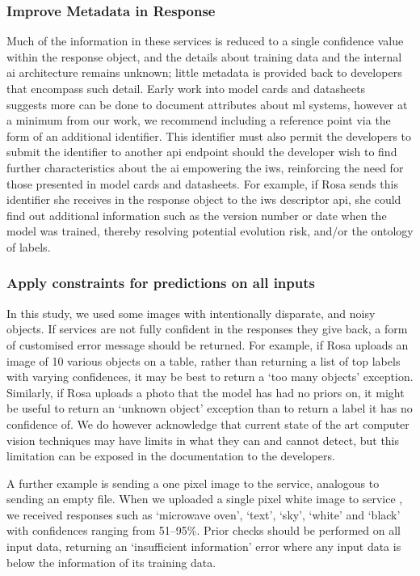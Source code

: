 \subsubsection{Improve Metadata in Response}
Much of the information in these services is reduced to a single confidence value within the response object, and the details about training data and the internal \gls{ai} architecture remains unknown; little metadata is provided back to developers that encompass such detail. Early work into model cards and datasheets~\citep{Mitchell:2018in,Gebru:2018wh} suggests more can be done to document attributes about \gls{ml} systems, however at a minimum from our work, we recommend including a reference point via the form of an additional identifier. This identifier must also permit the developers to submit the identifier to another \gls{api} endpoint should the developer wish to find further characteristics about the \gls{ai} empowering the \gls{iws}, reinforcing the need for those presented in model cards and datasheets. For example, if Rosa sends this identifier she receives in the response object to the \gls{iws} descriptor \gls{api}, she could find out additional information such as the version number or date when the model was trained, thereby resolving potential evolution risk, and/or the ontology of labels.
 
\subsubsection{Apply constraints for predictions on all inputs}
In this study, we used some images with intentionally disparate, and noisy objects. If services are not fully confident in the responses they  give back, a form of customised error message should be returned. For example, if Rosa uploads an image of 10 various objects on a table, rather than returning a list of top labels with varying confidences, it may be best to return a `too many objects' exception. Similarly, if Rosa uploads a photo that the model has had no priors on, it might be useful to return an `unknown object' exception than to return a label it has no confidence of. We do however acknowledge that current state of the art computer vision techniques may have limits in what they can and cannot detect, but this limitation can be exposed in the documentation to the developers.

A further example is sending a one pixel image to the service, analogous to sending an empty file. When we uploaded a single pixel white image to service \googleapi{}, we received responses such as `microwave oven', `text', `sky', `white' and `black' with confidences ranging from 51--95\%. Prior checks should be performed on all input data, returning an `insufficient information' error where any input data is below the information of its training data.
 
